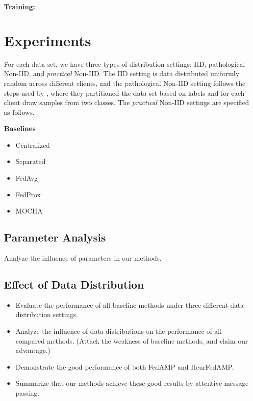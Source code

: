 {\begin{algorithm}[!t]
\textbf{Training:}\\
\end{algorithm}

\section{Experiments}

For each data set, we have three types of distribution settings: IID, pathological Non-IID, and \textit{practical} Non-IID. The IID setting is data distributed uniformly random across different clients, and the pathological Non-IID setting follows the steps used by \cite{mcmahan2016communication}, where they partitioned the data set based on labels and for each client draw samples from two classes. The \textit{practical} Non-IID settings are specified as follows. 

\textbf{Baselines}
\begin{itemize}
    \item Centralized
    \item Separated
    \item FedAvg
    \item FedProx
    \item MOCHA 
\end{itemize}

\subsection{Parameter Analysis}
Analyze the influence of parameters in our methods.

\subsection{Effect of Data Distribution}
\begin{itemize}
    \item Evaluate the performance of all baseline methods under three different data distribution settings.
    \item Analyze the influence of data distributions on the performance of all compared methods. (Attack the weakness of baseline methods, and claim our advantage.)
    \item Demonstrate the good performance of both {FedAMP} and {HeurFedAMP}.
    \item Summarize that our methods achieve these good results by attentive message passing.
\end{itemize}

}
